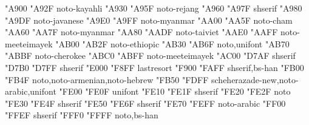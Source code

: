 \documentclass{article}
\begin{document}
                                           {  "A900} {  "A92F} {noto-kayahli}
                                             {  "A930} {  "A95F} {noto-rejang}
                             {  "A960} {  "A97F} {shserif}
                                           {  "A980} {  "A9DF} {noto-javanese}
                                 {  "A9E0} {  "A9FF} {noto-myanmar}
                                               {  "AA00} {  "AA5F} {noto-cham}
                                 {  "AA60} {  "AA7F} {noto-myanmar}
                                           {  "AA80} {  "AADF} {noto-taiviet}
                            {  "AAE0} {  "AAFF} {noto-meeteimayek}
                                {  "AB00} {  "AB2F} {noto-ethiopic}
                                   {  "AB30} {  "AB6F} {noto,unifont}
                                {  "AB70} {  "ABBF} {noto-cherokee}
                                       {  "ABC0} {  "ABFF} {noto-meeteimayek}
                                   {  "AC00} {  "D7AF} {shserif}
                             {  "D7B0} {  "D7FF} {shserif}
                                   {  "E000} {  "F8FF} {lastresort}
                       {  "F900} {  "FAFF} {shserif,bs-han}
                      {  "FB00} {  "FB4F} {noto,noto-armenian,noto-hebrew}
                        {  "FB50} {  "FDFF} {scheherazade-new,noto-arabic,unifont}
                                {  "FE00} {  "FE0F} {unifont}
                                     {  "FE10} {  "FE1F} {shserif}
                               {  "FE20} {  "FE2F} {noto}
                            {  "FE30} {  "FE4F} {shserif}
                                {  "FE50} {  "FE6F} {shserif}
                        {  "FE70} {  "FEFF} {noto-arabic}
                      {  "FF00} {  "FFEF} {shserif}
                                           {  "FFF0} {  "FFFF} {noto,bs-han}
\end{document}
